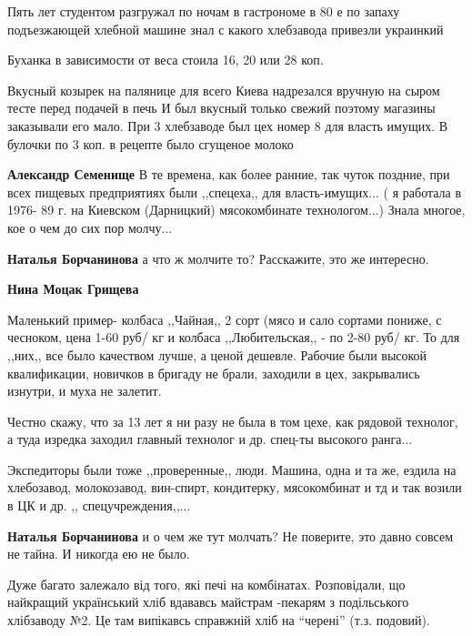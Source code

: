 \begin{itemize}

Пять лет студентом разгружал по ночам в гастрономе в 80 е по запаху
подъезжающей хлебной машине знал с какого хлебзавода привезли украинкий

Буханка в зависимости от веса стоила 16, 20 или 28 коп.

Вкусный козырек на палянице для всего Киева надрезался вручную на сыром тесте
перед подачей в печь И был вкусный только свежий поэтому магазины заказывали
его мало. При 3 хлебзаводе был цех номер 8 для власть имущих. В булочки по 3
коп. в рецепте было сгущеное молоко

\begin{itemize} %
\textbf{Александр Семенище} В те времена, как более ранние, так чуток поздние, при всех пищевых предприятиях были ,,спецеха,, для власть-имущих... ( я работала в 1976- 89 г. на Киевском (Дарницкий) мясокомбинате технологом...) Знала многое, кое о чем до сих пор молчу...

\textbf{Наталья Борчанинова} а что ж молчите то? Расскажите, это же интересно.

\textbf{Нина Моцак Грищева} 

Маленький пример- колбаса ,,Чайная,, 2 сорт (мясо и сало сортами пониже, с
чесноком, цена 1-60 руб/ кг и колбаса ,,Любительская,, - по 2-80 руб/ кг. То
для ,,них,, все было качеством лучше, а ценой дешевле. Рабочие были высокой
квалификации, новичков в бригаду не брали, заходили в цех, закрывались изнутри,
и муха не залетит.

Честно скажу, что за 13 лет я ни разу не была в том цехе, как рядовой технолог,
а туда изредка заходил главный технолог и др. спец-ты высокого ранга...

Экспедиторы были тоже ,,проверенные,, люди. Машина, одна и та же, ездила на
хлебозавод, молокозавод, вин-спирт, кондитерку, мясокомбинат и тд и так возили
в ЦК и др. ,, спецучреждения,,...

\textbf{Наталья Борчанинова} и о чем же тут молчать? Не поверите, это давно совсем не тайна. И никогда ею не было.
\end{itemize} %


Дуже багато залежало від того, які печі на комбінатах. Розповідали, що
найкращий український хліб вдававсь майстрам -пекарям з подільського хлібзаводу
№2. Це там випікавсь справжній хліб на \enquote{черені} (т.з. подовий).



\end{itemize}

